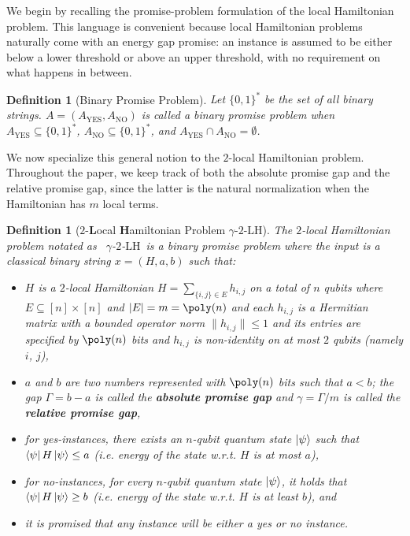 \documentclass[11pt]{article}
\theoremstyle{plain}
\newtheorem{definition}[theorem]{Definition}
\newcommand{\kLH}{$\gamma$-$2$-$\mathrm{LH}$}
\begin{document}
We begin by recalling the promise-problem formulation of the local Hamiltonian problem.  This language is convenient because local Hamiltonian problems naturally come with an energy gap promise: an instance is assumed to be either below a lower threshold or above an upper threshold, with no requirement on what happens in between.

\begin{definition}[Binary Promise Problem]
Let $\{0, 1\}^*$ be the set of all binary strings. $A = \left(A_{\mathrm{YES}}, A_{\mathrm{NO}}\right)$ is called a binary promise problem when $A_{\mathrm{YES}} \subseteq \{0, 1\}^*$, $A_{\mathrm{NO}} \subseteq \{0, 1\}^*$, and $A_{\mathrm{YES}} \cap A_{\mathrm{NO}} = \emptyset$.
\end{definition}

We now specialize this general notion to the $2$-local Hamiltonian problem.  Throughout the paper, we keep track of both the absolute promise gap and the relative promise gap, since the latter is the natural normalization when the Hamiltonian has $m$ local terms.

\begin{definition}[$2$-\textbf{L}ocal \textbf{H}amiltonian Problem \kLH]
\label{defn:k-LH}
The $2$-local Hamiltonian problem notated as \ \kLH\ is a binary promise problem where the input is a classical binary string $x = (H, a, b)$ such that:
\begin{itemize}
    \item $H$ is a $2$-local Hamiltonian $H = \sum\limits_{\{i, j\} \in E} h_{i, j}$ on a total of $n$ qubits where $E \subseteq [n] \times [n]$ and $|E| = m = \poly(n)$ and each $h_{i,j}$ is a Hermitian matrix with a bounded operator norm $\|h_{i,j}\| \leq 1$ and its entries are specified by $\poly(n)$ bits and $h_{i,j}$ is non-identity on at most $2$ qubits (namely $i$, $j$),
    \item $a$ and $b$ are two numbers represented with $\poly(n)$ bits such that $a < b$; the gap $\Gamma = b - a$ is called the \textbf{absolute promise gap} and $\gamma = \Gamma / m$ is called the \textbf{relative promise gap},
    \item for yes-instances, there exists an $n$-qubit quantum state $\ket{\psi}$ such that $\bra{\psi}H\ket{\psi} \leq a$ (i.e. energy of the state w.r.t. $H$ is at most $a$),
    \item for no-instances, for every $n$-qubit quantum state $\ket{\psi}$, it holds that $\bra{\psi}H\ket{\psi} \geq b$ (i.e. energy of the state w.r.t. $H$ is at least $b$), and
    \item it is promised that any instance will be either a yes or no instance.
\end{itemize}
\end{definition}
\end{document}

